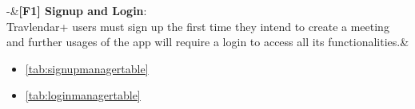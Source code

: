 \begin{flushleft}
\begin{table}[htp]
\begin{tabular}
\hline
-&\textbf{[\hypertarget{F1}{F1}] Signup and Login}: \\Travlendar+ users must sign up the first time they intend to create a meeting and further usages of the app will require a login to access all its functionalities.&\begin{itemize}
	\item \autoref{tab:signupmanagertable}
	
	\item\autoref{tab:loginmanagertable}
\end{itemize}\\
\hline

\end{tabular}

\caption{Traceability table } 
\label{tab:traceabilitytable}

\end{table}

\end{flushleft}